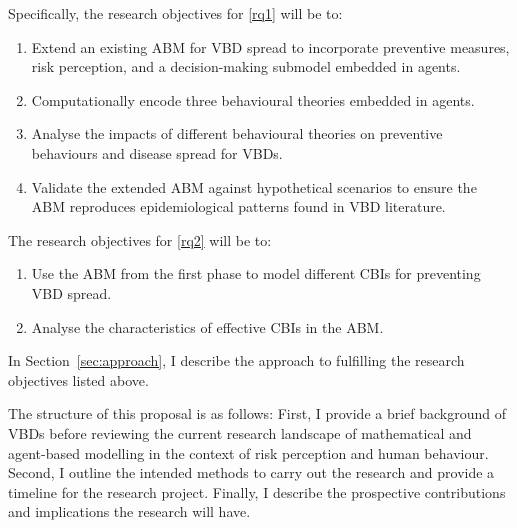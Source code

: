 Specifically, the research objectives for \ref{rq1} will be to:

\begin{enumerate}

\item Extend an existing ABM for VBD spread to incorporate preventive measures, risk perception, and a decision-making submodel embedded in agents.

\item Computationally encode three behavioural theories embedded in agents.

\item Analyse the impacts of different behavioural theories on preventive behaviours and disease spread for VBDs.

\item Validate the extended ABM against hypothetical scenarios to ensure the ABM reproduces epidemiological patterns found in VBD literature.

\end{enumerate}

The research objectives for \ref{rq2} will be to:

\begin{enumerate}
\item Use the ABM from the first phase to model different CBIs for preventing VBD spread.
\item Analyse the characteristics of effective CBIs in the ABM.
\end{enumerate}

In Section~\ref{sec:approach}, I describe the approach to fulfilling the research objectives listed above.

The structure of this proposal is as follows: First, I provide a brief background of VBDs before reviewing the current research landscape of mathematical and agent-based modelling in the context of risk perception and human behaviour. Second, I outline the intended methods to carry out the research and provide a timeline for the research project. Finally, I describe the prospective contributions and implications the research will have.\vspace{.5cm}





